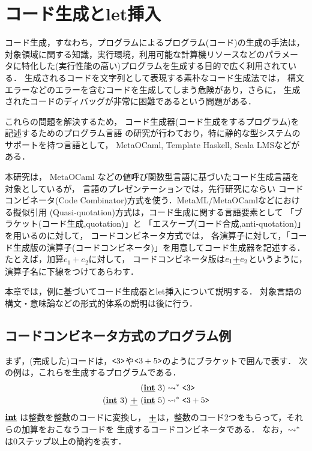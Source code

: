 
\section{コード生成とlet挿入}

コード生成，すなわち，プログラムによるプログラム(コード)の生成の手法は，
対象領域に関する知識，実行環境，利用可能な計算機リソースなどのパラメー
タに特化した(実行性能の高い)プログラムを生成する目的で広く利用されている．
生成されるコードを文字列として表現する素朴なコード生成法では，
構文エラーなどのエラーを含むコードを生成してしまう危険があり，さらに，
生成されたコードのディバッグが非常に困難であるという問題がある．

これらの問題を解決するため，
コード生成器(コード生成をするプログラム)を記述するためのプログラム言語
の研究が行わており，特に静的な型システムのサポートを持つ言語として，
MetaOCaml, Template Haskell, Scala LMSなどがある．

本研究は，
MetaOCaml などの値呼び関数型言語に基づいたコード生成言語を対象としているが，
言語のプレゼンテーションでは，先行研究にならい
コードコンビネータ(Code Combinator)方式を使う．MetaML/MetaOCamlなどにおける擬似引用
(Quasi-quotation)方式は，コード生成に関する言語要素として
「ブラケット(コード生成,quotation)」と
「エスケープ(コード合成,anti-quotation)」を用いるのに対して，
コードコンビネータ方式では，
各演算子に対して，「コード生成版の演算子(コードコンビネータ)」を用意してコード生成器を記述する．
たとえば，加算$e_1+e_2$に対して，
コードコンビネータ版は$e_1 \underline{\textbf{+}} e_2$というように，
演算子名に下線をつけてあらわす．

本章では，例に基づいてコード生成器とlet挿入について説明する．
対象言語の構文・意味論などの形式的体系の説明は後に行う．

\subsection{コードコンビネータ方式のプログラム例}

まず，(完成した)コードは，$\texttt{<}{3}\texttt{>}$や$\texttt{<}{3+5}\texttt{>}$のようにブラケットで囲んで表す．
次の例は，これらを生成するプログラムである．
\begin{align*}
(\underline{\textbf{int}}~3)   & \leadsto^* \texttt{<}{3}\texttt{>} \\
(\underline{\textbf{int}}~3)~ \underline{\textbf{+}}~ (\underline{\textbf{int}}~5) & \leadsto^* \texttt{<}{3 + 5}\texttt{>}
\end{align*}
$\underline{\textbf{int}}$ は整数を整数のコードに変換し，
$\underline{\textbf{+}}$は，整数のコード2つをもらって，それらの加算をおこなうコードを
生成するコードコンビネータである．
なお，$\leadsto^*$は0ステップ以上の簡約を表す．

